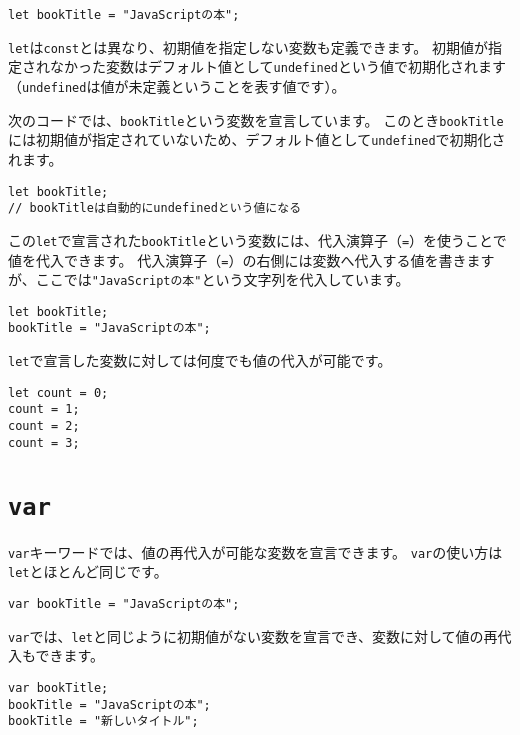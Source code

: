 \begin{lstlisting}
let bookTitle = "JavaScriptの本";
\end{lstlisting}

\texttt{let}は\texttt{const}とは異なり、初期値を指定しない変数も定義できます。
初期値が指定されなかった変数はデフォルト値として\texttt{undefined}という値で初期化されます（\texttt{undefined}は値が未定義ということを表す値です）。

次のコードでは、\texttt{bookTitle}という変数を宣言しています。
このとき\texttt{bookTitle}には初期値が指定されていないため、デフォルト値として\texttt{undefined}で初期化されます。

\begin{lstlisting}
let bookTitle;
// bookTitleは自動的にundefinedという値になる
\end{lstlisting}

この\texttt{let}で宣言された\texttt{bookTitle}という変数には、代入演算子（\texttt{=}）を使うことで値を代入できます。
代入演算子（\texttt{=}）の右側には変数へ代入する値を書きますが、ここでは\texttt{"JavaScriptの本"}という文字列を代入しています。

\begin{lstlisting}
let bookTitle;
bookTitle = "JavaScriptの本";
\end{lstlisting}

\texttt{let}で宣言した変数に対しては何度でも値の代入が可能です。

\begin{lstlisting}
let count = 0;
count = 1;
count = 2;
count = 3;
\end{lstlisting}

\hypertarget{var}{%
\section{\texorpdfstring{\texttt{var}}{var}}\label{var}}

\texttt{var}キーワードでは、値の再代入が可能な変数を宣言できます。
\texttt{var}の使い方は\texttt{let}とほとんど同じです。

\begin{lstlisting}
var bookTitle = "JavaScriptの本";
\end{lstlisting}

\texttt{var}では、\texttt{let}と同じように初期値がない変数を宣言でき、変数に対して値の再代入もできます。

\begin{lstlisting}
var bookTitle;
bookTitle = "JavaScriptの本";
bookTitle = "新しいタイトル";
\end{lstlisting}

